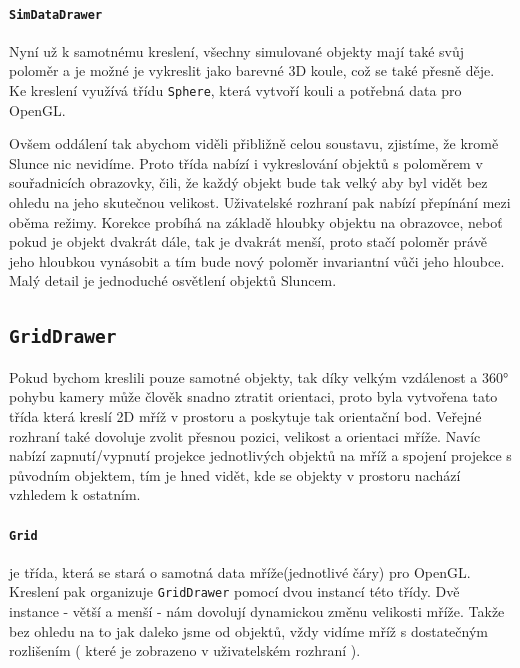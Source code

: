 \paragraph{\texttt{SimDataDrawer}}
Nyní už k samotnému kreslení, všechny simulované objekty mají také svůj poloměr a je možné je vykreslit jako barevné 3D koule, což se také přesně děje. Ke kreslení využívá třídu \texttt{Sphere}, která vytvoří kouli a potřebná data pro OpenGL. 

Ovšem oddálení tak abychom viděli přibližně celou soustavu, zjistíme, že kromě Slunce nic nevidíme. Proto třída nabízí i vykreslování objektů s poloměrem v souřadnicích obrazovky, čili, že každý objekt bude tak velký aby byl vidět bez ohledu na jeho skutečnou velikost. Uživatelské rozhraní pak nabízí přepínání mezi oběma režimy. Korekce probíhá na základě hloubky objektu na obrazovce, neboť pokud je objekt dvakrát dále, tak je dvakrát menší, proto stačí poloměr právě jeho hloubkou vynásobit a tím bude nový poloměr invariantní vůči jeho hloubce. Malý detail je jednoduché osvětlení objektů Sluncem.
\subsection{\texttt{GridDrawer}}
Pokud bychom kreslili pouze samotné objekty, tak díky velkým vzdálenost a 360° pohybu kamery může člověk snadno ztratit orientaci, proto byla vytvořena tato třída která kreslí 2D mříž v prostoru a poskytuje tak orientační bod. Veřejné rozhraní také dovoluje zvolit přesnou pozici, velikost a orientaci mříže. Navíc nabízí zapnutí/vypnutí projekce jednotlivých objektů na mříž a spojení projekce s původním objektem, tím je hned vidět, kde se objekty v prostoru nachází vzhledem k ostatním.

\paragraph{\texttt{Grid}} je třída, která se stará o samotná data mříže(jednotlivé čáry) pro OpenGL. Kreslení pak organizuje \texttt{GridDrawer} pomocí dvou instancí této třídy. Dvě instance - větší a menší - nám dovolují dynamickou změnu velikosti mříže. Takže bez ohledu na to jak daleko jsme od objektů, vždy vidíme mříž s dostatečným rozlišením ( které je zobrazeno v uživatelském rozhraní ). 

